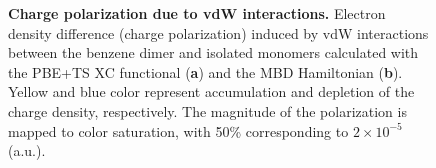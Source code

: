 \begin{figure}
\caption{\textbf{Charge polarization due to vdW interactions.}
Electron density difference (charge polarization) induced by vdW interactions between the benzene dimer and isolated monomers calculated with the PBE+TS XC functional (\textbf a) and the MBD Hamiltonian (\textbf b).
Yellow and blue color represent accumulation and depletion of the charge density, respectively.
The magnitude of the polarization is mapped to color saturation, with 50\% corresponding to $2\times10^{-5}$ (a.u.).
}\label{fig:density-benzene}
\end{figure}

